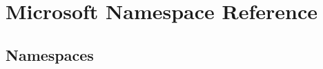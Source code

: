 \hypertarget{namespace_microsoft}{}\section{Microsoft Namespace Reference}
\label{namespace_microsoft}
\subsection*{Namespaces}
\begin{DoxyCompactItemize}
\end{DoxyCompactItemize}
